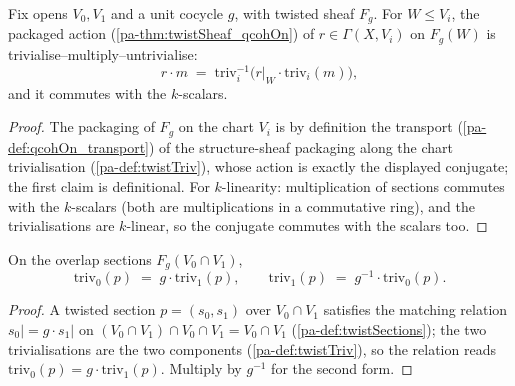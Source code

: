 \begin{lemma}
  \label{pa-lem:twistSheaf_qsmul_eq}
  \leanok

  Fix opens \(V_0, V_1\) and a unit cocycle \(g\), with twisted sheaf \(F_g\). For
  \(W \le V_i\), the packaged action (\ref{pa-thm:twistSheaf_qcohOn}) of
  \(r \in \Gamma(X, V_i)\) on \(F_g(W)\) is
  trivialise--multiply--untrivialise:
  \[
    r \cdot m \;=\; \mathrm{triv}_i^{-1}\bigl(r|_W \cdot \mathrm{triv}_i(m)\bigr),
  \]
  and it commutes with the \(k\)-scalars.
\end{lemma}
\begin{proof}
  \leanok
  The packaging of \(F_g\) on the chart \(V_i\) is by definition the transport
  (\ref{pa-def:qcohOn_transport}) of the structure-sheaf packaging along the chart
  trivialisation (\ref{pa-def:twistTriv}), whose action is exactly the displayed conjugate;
  the first claim is definitional. For \(k\)-linearity: multiplication of sections
  commutes with the \(k\)-scalars (both are multiplications in a commutative ring), and
  the trivialisations are \(k\)-linear, so the conjugate commutes with the scalars too.
\end{proof}

\begin{lemma}
  \label{pa-lem:twistTriv_inf_eq}
  \leanok

  On the overlap sections \(F_g(V_0 \cap V_1)\),
  \[
    \mathrm{triv}_0(p) \;=\; g \cdot \mathrm{triv}_1(p), \qquad
    \mathrm{triv}_1(p) \;=\; g^{-1} \cdot \mathrm{triv}_0(p).
  \]
\end{lemma}
\begin{proof}
  \leanok
  A twisted section \(p = (s_0, s_1)\) over \(V_0 \cap V_1\) satisfies the matching
  relation \(s_0| = g \cdot s_1|\) on \((V_0 \cap V_1) \cap V_0 \cap V_1 = V_0 \cap
  V_1\) (\ref{pa-def:twistSections}); the two trivialisations are the two components
  (\ref{pa-def:twistTriv}), so the relation reads \(\mathrm{triv}_0(p) = g \cdot
  \mathrm{triv}_1(p)\). Multiply by \(g^{-1}\) for the second form.
\end{proof}

